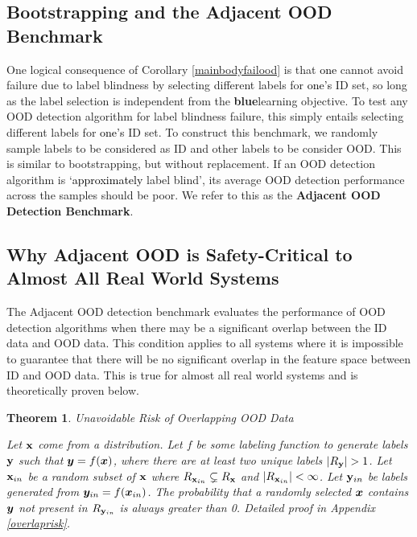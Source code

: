 \documentclass{article} %
\theoremstyle{plain}
\newtheorem{theorem}{Theorem}[section]
\theoremstyle{definition}
\theoremstyle{remark}
\begin{document}
\subsection{Bootstrapping and the Adjacent OOD Benchmark}\vspace{-2mm}

One logical consequence of Corollary \ref{mainbodyfailood} is that \textcolor{black}{one}  cannot avoid failure due to label blindness by selecting different labels for \textcolor{black}{one's} ID set, so long as the label selection is independent from the \textbf{blue}{learning} objective. To test any OOD detection algorithm for label blindness failure, this simply entails selecting different labels for \textcolor{black}{one's} ID set. To construct this benchmark, we randomly sample labels to be considered as ID and other labels to be consider OOD. This is similar to bootstrapping, but without replacement. If an OOD detection algorithm is `\textcolor{black}{approximately} label blind', its average OOD detection performance across the samples should be poor. We refer to this as the \textbf{Adjacent OOD Detection Benchmark}. 

\subsection{Why Adjacent OOD is Safety-Critical to Almost All Real World Systems}

The Adjacent OOD detection benchmark evaluates the performance of OOD detection algorithms when there may be a significant overlap between the ID data and OOD data. This condition applies to all systems where it is impossible to guarantee that there will be no significant overlap in the feature space between ID and OOD data. This is true for almost all real world systems and is theoretically proven below. 

\begin{theorem}
Unavoidable Risk of Overlapping OOD Data

Let ${\mathbf{x}}$ come from a distribution. Let $f$ be some labeling function to generate labels ${\mathbf{y}}$ such that ${\bm{y}} = f({\bm{x}})$, where there are at least two unique labels $|R_{\mathbf{y}}| > 1$. Let ${\mathbf{x}}_{in}$ be a random subset of ${\mathbf{x}}$ where $R_{{\mathbf{x}}_{in}} \subsetneq R_{\mathbf{x}}$ and $|R_{{\mathbf{x}}_{in}}| < \infty$. Let ${\mathbf{y}}_{in}$ be labels generated from ${\bm{y}}_{in} = f({\bm{x}}_{in})$. The probability that a randomly selected ${\bm{x}}$ contains ${\bm{y}}$ not present in $R_{{\mathbf{y}}_{in}}$ is always greater than 0. 
\label{mainbodyoverlap}
Detailed proof in Appendix \ref{overlaprisk}.
\end{theorem}
\end{document}
